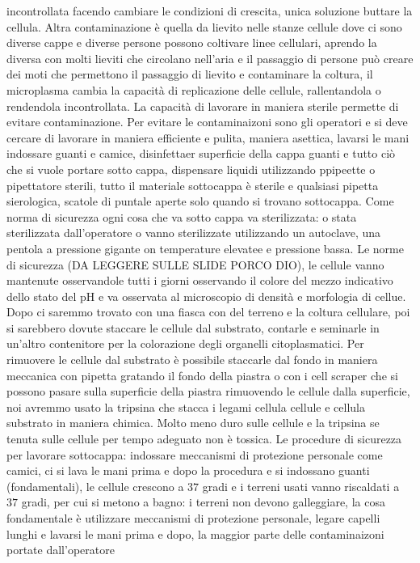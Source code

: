 incontrollata facendo cambiare le condizioni di crescita, unica soluzione buttare la cellula. Altra contaminazione \`e quella da lievito nelle stanze cellule dove ci sono diverse 
cappe e diverse persone possono coltivare linee cellulari, aprendo la diversa con molti  lieviti che circolano nell'aria e il passaggio di persone pu\`o creare dei moti che permettono 
il passaggio di lievito e contaminare la coltura, il microplasma cambia la capacit\`a di replicazione delle cellule, rallentandola o rendendola incontrollata. La capacit\`a di lavorare in
maniera sterile permette di evitare contaminazione. Per evitare le contaminaizoni sono gli operatori e si deve cercare di lavorare in maniera efficiente e pulita, maniera asettica, 
lavarsi le mani indossare guanti e camice, disinfettaer superficie della cappa guanti e tutto ci\`o che si vuole portare sotto cappa, dispensare liquidi utilizzando ppipeette o 
pipettatore sterili, tutto il materiale sottocappa \`e sterile e qualsiasi pipetta sierologica, scatole di puntale aperte solo quando si trovano sottocappa. Come norma di sicurezza ogni
cosa che va sotto cappa va sterilizzata: o stata sterilizzata dall'operatore o vanno sterilizzate utilizzando un autoclave, una pentola a pressione gigante on temperature elevatee e 
pressione bassa. Le norme di sicurezza (DA LEGGERE SULLE SLIDE PORCO DIO), le cellule vanno mantenute osservandole tutti i giorni osservando il colore del mezzo indicativo dello stato del
pH e va osservata al microscopio di densit\`a e morfologia di cellue. Dopo ci saremmo trovato con una fiasca con del terreno e la coltura cellulare, poi si sarebbero dovute staccare le 
cellule dal substrato, contarle e seminarle in un'altro contenitore per la colorazione degli organelli citoplasmatici. Per rimuovere le cellule dal substrato \`e possibile staccarle dal
fondo in maniera meccanica con pipetta gratando il fondo della piastra o con i cell scraper che si possono pasare sulla superficie della piastra rimuovendo le cellule dalla superficie, 
noi avremmo usato la tripsina che stacca i legami cellula cellule e cellula substrato in maniera chimica. Molto meno duro sulle cellule e la tripsina se tenuta sulle cellule per tempo
adeguato non \`e tossica. Le procedure di sicurezza per lavorare sottocappa: indossare meccanismi di protezione personale come camici, ci si lava le mani prima e dopo la procedura e si 
indossano guanti (fondamentali), le cellule crescono a $37$ gradi e i terreni usati vanno riscaldati a $37$ gradi, per cui si metono a bagno: i terreni non devono galleggiare, la cosa
fondamentale \`e utilizzare meccanismi di protezione personale, legare capelli lunghi e lavarsi le mani prima e dopo, la maggior parte delle contaminaizoni portate dall'operatore 
